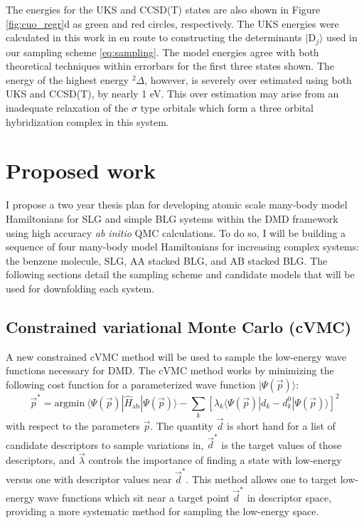 \documentclass[12pt]{article}
\begin{document}
The energies for the UKS and CCSD(T) \cite{Xian2000} states are also shown in Figure \ref{fig:cuo_regr}d as green and red circles, respectively.
The UKS energies were calculated in this work in en route to constructing the determinants $|\text{D}_j\rangle$ used in our sampling scheme \eqref{eq:sampling}.
The model energies agree with both theoretical techniques within errorbars for the first three states shown.
The energy of the highest energy $^2\Delta$, however, is severely over estimated using both UKS and CCSD(T), by nearly 1 eV.
This over estimation may arise from an inadequate relaxation of the $\sigma$ type orbitals which form a three orbital hybridization complex in this system.

\section{Proposed work}
I propose a two year thesis plan for developing atomic scale many-body
model Hamiltonians for SLG and simple BLG systems within the DMD framework using high accuracy \textit{ab initio} QMC calculations.
To do so, I will be building a sequence of four many-body model Hamiltonians for increasing complex systems: the benzene molecule, SLG, AA stacked BLG, and AB stacked BLG.
The following sections detail the sampling scheme and candidate models that will be used for downfolding each system.

\subsection{Constrained variational Monte Carlo (cVMC)}
A new constrained cVMC method will be used to sample the low-energy wave functions necessary for DMD.
The cVMC method works by minimizing the following cost function for a parameterized wave function $|\Psi(\vec{p})\rangle$:
\begin{equation}
\vec{p}^* = \text{argmin} \ \langle \Psi(\vec{p}) | \hat{H}_\text{ab} | \Psi(\vec{p}) \rangle - \sum_k [\lambda_k \langle \Psi(\vec{p}) | d_k - d_{k}^0 | \Psi(\vec{p}) \rangle]^2
\end{equation}
with respect to the parameters $\vec{p}$.
The quantity $\vec{d}$ is short hand for a list of candidate descriptors to sample variations in, $\vec{d}^*$ is the target values of those descriptors, and $\vec{\lambda}$ controls the importance of finding a state with low-energy versus one with descriptor values near $\vec{d}^*$.
This method allows one to target low-energy wave functions which sit near a target point $\vec{d}^*$ in descriptor space, providing a more systematic method for sampling the low-energy space.
\end{document}
